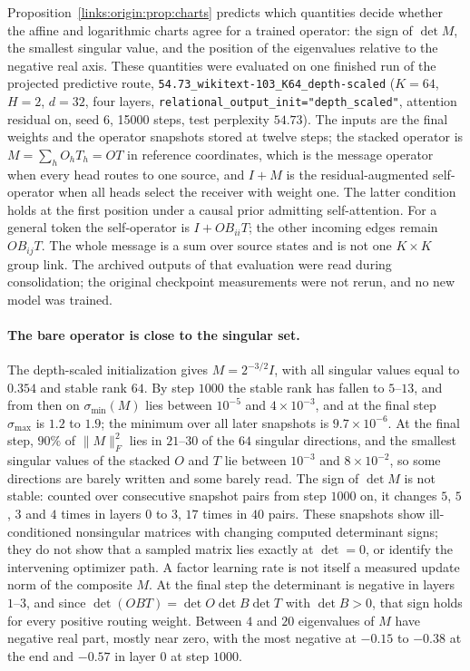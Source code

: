 \documentclass[11pt]{article}
\theoremstyle{definition}
\theoremstyle{remark}
\providecommand{\cfg}[1]{{\small\texttt{#1}}}
\begin{document}
Proposition~\ref{links:origin:prop:charts} predicts which quantities decide whether the affine and logarithmic charts agree for a trained operator: the sign of $\det M$, the smallest singular value, and the position of the eigenvalues relative to the negative real axis. These quantities were evaluated on one finished run of the projected predictive route, \texttt{54.73\_wikitext-103\_K64\_depth-scaled} ($K=64$, $H=2$, $d=32$, four layers, \cfg{relational\_output\_init="depth\_scaled"}, attention residual on, seed 6, 15000 steps, test perplexity $54.73$). The inputs are the final weights and the operator snapshots stored at twelve steps; the stacked operator is $M=\sum_hO_hT_h=OT$ in reference coordinates, which is the message operator when every head routes to one source, and $I+M$ is the residual-augmented self-operator when all heads select the receiver with weight one. The latter condition holds at the first position under a causal prior admitting self-attention. For a general token the self-operator is $I+OB_{ii}T$; the other incoming edges remain $OB_{ij}T$. The whole message is a sum over source states and is not one $K\times K$ group link. The archived outputs of that evaluation were read during consolidation; the original checkpoint measurements were not rerun, and no new model was trained.

\paragraph{The bare operator is close to the singular set.}
The depth-scaled initialization gives $M=2^{-3/2}I$, with all singular values equal to $0.354$ and stable rank $64$. By step $1000$ the stable rank has fallen to $5$--$13$, and from then on $\sigma_{\min}(M)$ lies between $10^{-5}$ and $4\times10^{-3}$, and at the final step $\sigma_{\max}$ is $1.2$ to $1.9$; the minimum over all later snapshots is $9.7\times10^{-6}$. At the final step, $90\%$ of $\|M\|_F^2$ lies in $21$--$30$ of the $64$ singular directions, and the smallest singular values of the stacked $O$ and $T$ lie between $10^{-3}$ and $8\times10^{-2}$, so some directions are barely written and some barely read. The sign of $\det M$ is not stable: counted over consecutive snapshot pairs from step $1000$ on, it changes $5$, $5$, $3$ and $4$ times in layers $0$ to $3$, $17$ times in $40$ pairs. These snapshots show ill-conditioned nonsingular matrices with changing computed determinant signs; they do not show that a sampled matrix lies exactly at $\det=0$, or identify the intervening optimizer path. A factor learning rate is not itself a measured update norm of the composite $M$. At the final step the determinant is negative in layers $1$--$3$, and since $\det(OBT)=\det O\det B\det T$ with $\det B>0$, that sign holds for every positive routing weight. Between $4$ and $20$ eigenvalues of $M$ have negative real part, mostly near zero, with the most negative at $-0.15$ to $-0.38$ at the end and $-0.57$ in layer $0$ at step $1000$.
\end{document}
